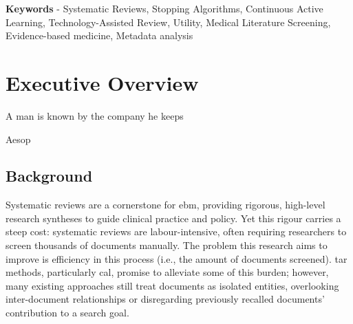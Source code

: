 \documentclass[10pt,oneside]{book}
\begin{document}
    \textbf{Keywords} -  Systematic Reviews, Stopping Algorithms, Continuous Active Learning, Technology-Assisted Review, Utility, Medical Literature Screening, Evidence-based medicine, Metadata analysis
\newpage
\begingroup %
\small %
\vspace*{-3cm}
\tableofcontents

\endgroup
\newpage
\newcommand{\lightshadowbox}[1]{%
  \setlength{\fboxsep}{6pt}%
  \setlength{\shadowsize}{1pt}%
  \shadowbox{#1}%
}
\begin{multicols}{2}
\printglossary[type=\acronymtype]
\end{multicols}
\newpage
\chapter{Executive Overview}

\epigraph{A man is known by the company he keeps}{Aesop}

\section{Background}
Systematic reviews are a cornerstone for \gls*{ebm}, providing rigorous, high-level research syntheses to guide clinical practice and policy. Yet this rigour carries a steep cost: systematic reviews are labour-intensive, often requiring researchers to screen thousands of documents manually. The problem this research aims to improve is efficiency in this process (i.e., the amount of documents screened). \gls*{tar} methods, particularly \gls*{cal}, promise to alleviate some of this burden; however, many existing approaches still treat documents as isolated entities, overlooking inter-document relationships or disregarding previously recalled documents' contribution to a search goal.
\end{document}
